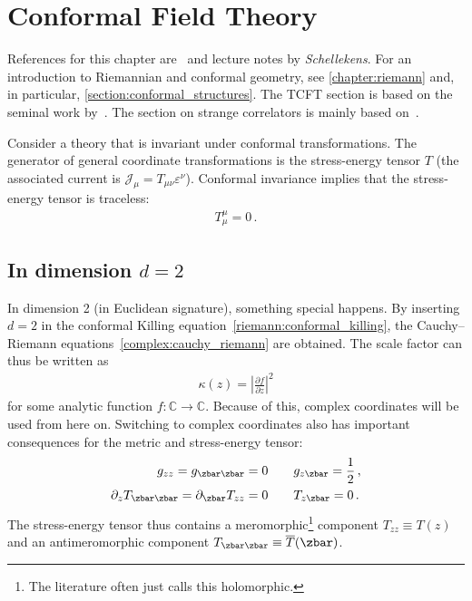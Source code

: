 \chapter{Conformal Field Theory}\label{chapter:cft}

    References for this chapter are~\citet{schottenloher_mathematical_2008,gui_lectures_2023,fuchs_algebraic_2023} and lecture notes by \textit{Schellekens}. For an introduction to Riemannian and conformal geometry, see \cref{chapter:riemann} and, in particular, \cref{section:conformal_structures}. The TCFT section is based on the seminal work by~\citet{fuchs_tft_2002,fuchs_tft_2004,fuchs_tft_2004-1,fuchs_tft_2005,fjelstad_tft_2005}. The section on strange correlators is mainly based on~\citet{vanhove_mapping_2018,you_wave_2014}.

    \minitoc


    \begin{property}
        Consider a theory that is invariant under conformal transformations. The generator of general coordinate transformations is the stress-energy tensor $T$ (the associated current is $\mathcal{J}_\mu = T_{\mu\nu}\varepsilon^\nu$). Conformal invariance implies that the stress-energy tensor is traceless:
        \begin{gather}
            T^\mu_\mu = 0\,.
        \end{gather}
    \end{property}


\section{\texorpdfstring{In dimension $d=2$}{In dimension d=2}}

    In dimension 2 (in Euclidean signature), something special happens. By inserting $d=2$ in the conformal Killing equation~\eqref{riemann:conformal_killing}, the Cauchy--Riemann equations~\ref{complex:cauchy_riemann} are obtained. The scale factor can thus be written as
    \begin{gather}
        \kappa(z) = \left|\frac{\partial f}{\partial z}\right|^2
    \end{gather}
    for some analytic function $f:\mathbb{C}\rightarrow\mathbb{C}$. Because of this, complex coordinates will be used from here on. Switching to complex coordinates also has important consequences for the metric and stress-energy tensor:
    \begin{gather}
        \begin{aligned}
            g_{zz} = g_{\zbar\zbar} = 0&\qquad g_{z\zbar} = \frac{1}{2}\,,\\
            \partial_zT_{\zbar\zbar} = \partial_{\zbar} T_{zz} = 0&\qquad T_{z\zbar} = 0\,.
        \end{aligned}
    \end{gather}
    The stress-energy tensor thus contains a meromorphic\footnote{The literature often just calls this holomorphic.} component $T_{zz}\equiv T(z)$ and an antimeromorphic component $T_{\zbar\zbar}\equiv\overline{T}(\zbar)$.

